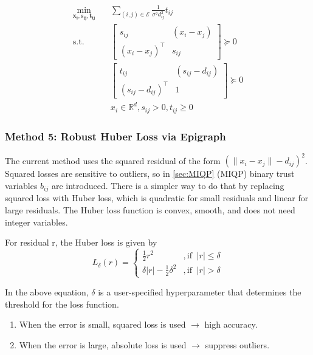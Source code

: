 \documentclass[11pt,a4paper]{article}
\begin{document}
\begin{equation}
\boxed{
\begin{aligned}
\min_{\mathbf{x_i}, \mathbf{s_{ij}}, \mathbf{t_{ij}}} \quad & \sum_{(i,j) \in \mathcal{E}} \frac{1}{\sigma^2 d_{ij}^2} t_{ij} \\
\text{s.t.} \quad & \begin{bmatrix} s_{ij} & (x_i- x_j) \\
        (x_i- x_j)^\top & s_{ij}\end{bmatrix} \succeq0 \\
        \quad & \begin{bmatrix} t_{ij} & (s_{ij}- d_{ij}) \\ (s_{ij}- d_{ij})^\top & 1\end{bmatrix}  \succeq 0 \\
        \quad & x_i \in \mathbb{R}^d, s_{ij} > 0, t_{ij} \geq 0
\end{aligned}}
\label{eq:socp_epi}
\end{equation}


\subsubsection{Method 5: Robust Huber Loss via Epigraph}
The current method uses the squared residual of the form $\left(\|{x}_i - {x}_j\| - d_{ij}\right)^2$. Squared losses are sensitive to outliers, so in \autoref{sec:MIQP} (MIQP) binary trust variables $b_{ij}$ are introduced. There is a simpler way to do that by replacing squared loss with Huber loss, which is quadratic for small residuals and linear for large residuals.  The Huber loss function is convex, smooth, and does not need integer variables. 

For residual r, the Huber loss is given by
\begin{equation}
    L_\delta(r) = \begin{cases} \frac{1}{2}r^2 &, \text{if} \;\;|r| \leq \delta\\
    \delta|r|-\frac{1}{2}\delta^2 &, \text{if} \;\; |r|>\delta
    \end{cases}
    \label{huber_loss}
\end{equation}

In the above equation, $\delta$ is a user-specified hyperparameter that determines the threshold for the loss function.

\begin{enumerate}[label=(\roman*)]
    \item When the error is small, squared loss is used $\rightarrow$ high accuracy.
    \item When the error is large, absolute loss is used $\rightarrow$ suppress outliers.
\end{enumerate}
\end{document}
